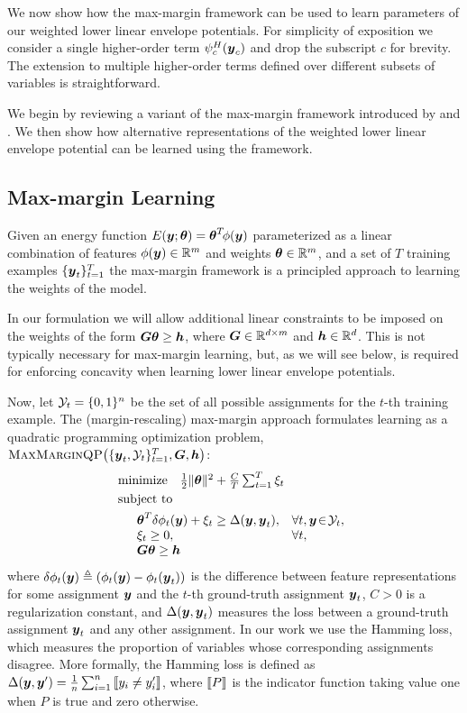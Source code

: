 \documentclass[10pt,journal,letterpaper,compsoc]{IEEEtran}
\renewcommand{\citename}{\citet}
\newcommand{\mmqp}[3]{\textrm{\sc MaxMarginQP}\!\left(\{\by_t, #1\}_{t=1}^{T}, #2, #3\right)}
\begin{document}
We now show how the max-margin framework can be used to learn
parameters of our weighted lower linear envelope potentials. For
simplicity of exposition we consider a single higher-order term
$\psi^{H}_c({\boldsymbol{y}}_c)$ and drop the subscript $c$ for brevity. The
extension to multiple higher-order terms defined over different
subsets of variables is straightforward.

We begin by reviewing a variant of the max-margin framework introduced
by \citename{Tsochantaridis:ICML04} and \citename{Taskar:ICML05}. We
then show how alternative representations of the weighted lower linear
envelope potential can be learned using the framework.

\subsection{Max-margin Learning}
%
Given an energy function $E\!\left({\boldsymbol{y}}; \boldsymbol{\theta}\right) = \boldsymbol{\theta}^T \!
\phi({\boldsymbol{y}})$ parameterized as a linear combination of features
$\phi({\boldsymbol{y}}) \in \mathbb{R}^m$ and weights $\boldsymbol{\theta} \in \mathbb{R}^m$, and a set
of $T$ training examples $\{{\boldsymbol{y}}_t\}_{t=1}^T$ the max-margin framework
is a principled approach to learning the weights of the model.

In our formulation we will allow additional linear constraints to be
imposed on the weights of the form ${\boldsymbol{G}} \boldsymbol{\theta} \geq {\boldsymbol{h}}$, where ${\boldsymbol{G}}
\in \mathbb{R}^{d \times m}$ and ${\boldsymbol{h}} \in \mathbb{R}^d$. This is not typically
necessary for max-margin learning, but, as we will see below, is
required for enforcing concavity when learning lower linear envelope
potentials.

Now, let $\Y_t = \{0, 1\}^n$ be the set of all possible assignments
for the $t$-th training example. The (margin-rescaling) max-margin
approach formulates learning as a quadratic programming optimization
problem, $\mmqp{\Y_t}{\bG}{\bh}$:
%
\begin{align}
  & \textrm{minimize} \quad \textstyle \frac{1}{2} \|\btheta\|^2 + \frac{C}{T} \sum_{t=1}^{T} \xi_t
  \label{eqn:maxmarginqp} \\
  & \textrm{subject to} \notag \\
  & \begin{array}{lll}
    & \btheta^T \delta\phi_t(\by) + \xi_t \geq \Delta(\by, \by_t), & \forall t, \by \!\in\! \Y_t, \\
    & \xi_t \geq 0, & \forall t, \\
    & \bG \btheta \geq \bh
  \end{array} \notag
\end{align}
%
where $\delta\phi_t({\boldsymbol{y}}) \triangleq \left(\phi_t({\boldsymbol{y}}) -
\phi_t({\boldsymbol{y}}_t)\right)$ is the difference between feature
representations for some assignment ${\boldsymbol{y}}$ and the $t$-th ground-truth
assignment ${\boldsymbol{y}}_t$, $C > 0$ is a regularization constant, and
$\Delta({\boldsymbol{y}}, {\boldsymbol{y}}_t)$ measures the loss between a ground-truth
assignment ${\boldsymbol{y}}_t$ and any other assignment. In our work we use the
Hamming loss, which measures the proportion of variables whose
corresponding assignments disagree. More formally, the Hamming loss is
defined as $\Delta(\by, \by') = \frac{1}{n} \sum_{i=1}^{n} \ind{y_i
  \neq y'_i}$, where $\ind{P}$ is the indicator function taking value
one when $P$ is true and zero otherwise.
\end{document}
